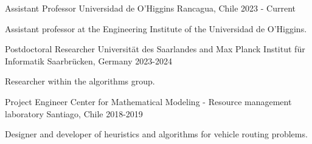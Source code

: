

\begin{cventries}

\cventry
{Assistant Professor} %
{Universidad de O'Higgins} %
{Rancagua, Chile} %
{2023 - Current} %
{
  \begin{cvitems}
    \item Assistant professor at the Engineering Institute of the Universidad de O'Higgins. 
  \end{cvitems}
}

\cventry
{Postdoctoral Researcher} %
{Universität des Saarlandes and Max Planck Institut für Informatik} %
{Saarbrücken, Germany} %
{2023-2024} %
{
  \begin{cvitems}
    \item Researcher within the algorithms group.
  \end{cvitems}
}
\cventry
    {Project Engineer} %
    {Center for Mathematical Modeling - Resource management laboratory} %
    {Santiago, Chile} %
    {2018-2019} %
    {
    \begin{cvitems}
      \item Designer and developer of heuristics and algorithms for vehicle routing problems.
    \end{cvitems}
    }
\end{cventries}
